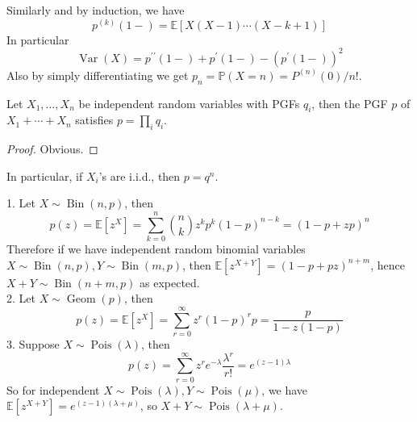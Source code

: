 Similarly and by induction, we have
$$p^{(k)}(1-)=\mathbb E[X(X-1)\cdots (X-k+1)]$$
In particular
$$\operatorname{Var}(X)=p^{\prime\prime}(1-)+p^\prime(1-)-(p^\prime(1-))^2$$
Also by simply differentiating we get $p_n=\mathbb P(X=n)=P^{(n)}(0)/n!$.
\begin{proposition}
    Let $X_1,\ldots,X_n$ be independent random variables with PGFs $q_i$, then the PGF $p$ of $X_1+\cdots +X_n$ satisfies $p=\prod_iq_i$.
\end{proposition}
\begin{proof}
    Obvious.
\end{proof}
In particular, if $X_i$'s are i.i.d., then $p=q^n$.
\begin{example}
    1. Let $X\sim\operatorname{Bin}(n,p)$, then
    $$p(z)=\mathbb E[z^X]=\sum_{k=0}^n\binom{n}{k}z^kp^k(1-p)^{n-k}=(1-p+zp)^n$$
    Therefore if we have independent random binomial variables $X\sim\operatorname{Bin}(n,p),Y\sim\operatorname{Bin}(m,p)$, then $\mathbb E[z^{X+Y}]=(1-p+pz)^{n+m}$, hence $X+Y\sim\operatorname{Bin}(n+m,p)$ as expected.\\
    2. Let $X\sim\operatorname{Geom}(p)$, then
    $$p(z)=\mathbb E[z^X]=\sum_{r=0}^\infty z^r(1-p)^rp=\frac{p}{1-z(1-p)}$$
    3. Suppose $X\sim\operatorname{Pois}(\lambda)$, then
    $$p(z)=\sum_{r=0}^\infty z^re^{-\lambda}\frac{\lambda^r}{r!}=e^{(z-1)\lambda}$$
    So for independent $X\sim\operatorname{Pois}(\lambda),Y\sim\operatorname{Pois}(\mu)$, we have $\mathbb E[z^{X+Y}]=e^{(z-1)(\lambda+\mu)}$, so $X+Y\sim\operatorname{Pois}(\lambda+\mu)$.
\end{example}
